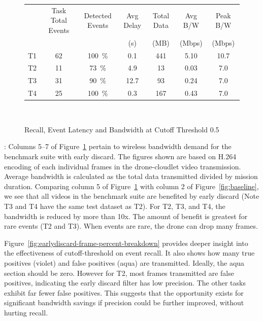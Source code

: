 \begin{figure}
\centering
\begin{tabular}{|c|c|c|c|c|c|c|}
\hline
   &Task Total Events   &Detected Events       &Avg Delay & Total Data &Avg B/W &Peak B/W\\
   & & &(s)&(MB)&(Mbps)&(Mbps)\\ 

\hline
T1 & \phantom{0}62  & 100~\%       &  \phantom{0}0.1&\phantom{0}441  &  5.10     &   10.7  \\
\hline
T2 & \phantom{0}11  & \phantom{0}73~\%      & \phantom{0}4.9 & \phantom{00}13            &  0.03 & \phantom{0}7.0 \\ %
\hline
T3 & \phantom{0}31  & \phantom{0}90~\%  & 12.7 & \phantom{00}93  &  0.24 &  \phantom{0}7.0 \\ %
\hline
T4 & \phantom{0}25  & 100~\%       & \phantom{0}0.3 & \phantom{0}167  &  0.43 &  \phantom{0}7.0 \\
\hline
\end{tabular}\\
\caption{Recall, Event Latency and Bandwidth at Cutoff Threshold 0.5}
\label{fig:early-discard-results}
\end{figure}


: Columns 5--7 of
Figure~\ref{fig:early-discard-results} pertain to wireless bandwidth demand for
the benchmark suite with early discard.  The figures shown are based on H.264
encoding of each individual frames in the drone-cloudlet video transmission.
Average bandwidth is calculated as the total data transmitted divided by
mission duration.  Comparing column 5 of Figure~\ref{fig:early-discard-results}
with column 2 of Figure~\ref{fig:baseline}, we see that all videos in the
benchmark suite are benefited by early discard (Note T3 and T4 have the same
test dataset as T2). For T2, T3, and T4, the bandwidth is reduced by more than
10x. The amount of benefit is greatest for rare events (T2 and T3).  When
events are rare, the drone can drop many frames.

Figure~\ref{fig:earlydiscard-frame-percent-breakdown} provides deeper insight
into the effectiveness of cutoff-threshold on event recall. It also shows how
many true positives (violet) and false positives (aqua) are
transmitted. Ideally, the aqua section should be zero.  However for T2, most
frames transmitted are false positives, indicating the early discard filter has
low precision.  The other tasks exhibit far fewer false positives.  This
suggests that the opportunity exists for significant bandwidth savings if
precision could be further improved, without hurting recall.

